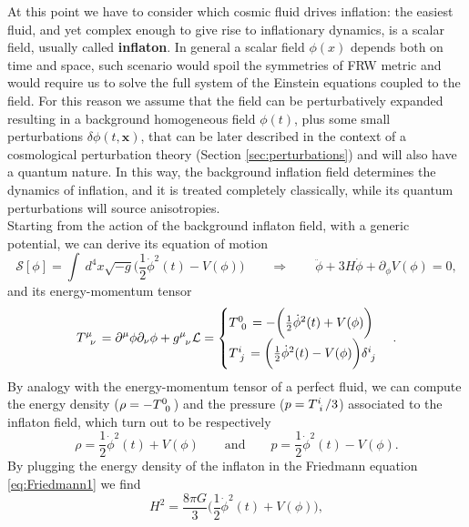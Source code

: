 At this point we have to consider which cosmic fluid drives inflation: the easiest fluid, and yet complex enough to give rise to inflationary dynamics, is a scalar field, usually called \textbf{inflaton}. In general a scalar field $\phi(x)$ depends both on time and space, such scenario would spoil the symmetries of FRW metric and would require us to solve the full system of the Einstein equations coupled to the field. For this reason we assume that the field can be perturbatively expanded resulting in a background homogeneous field $\phi(t)$, plus some small perturbations $\delta \phi(t,\mathbf x)$, that can be later described in the context of a cosmological perturbation theory (Section \ref{sec:perturbations}) and will also have a quantum nature. In this way, the background  inflation field determines the dynamics of inflation, and it is treated completely classically, while its quantum perturbations will source anisotropies.\\
Starting from the action of the background inflaton field, with a generic potential, we can derive its equation of motion
\begin{equation}
    \mathcal{S}[\phi]=\int\ d^4x\sqrt{-g}\bigg(\frac{1}{2}\dot\phi^2(t)-V(\phi)\bigg)\qquad\Rightarrow\qquad\boxed{\ddot\phi+3H\dot \phi+\partial_\phi V(\phi)=0},\label{eq:motion_inflaton}
\end{equation}
and its energy-momentum tensor
\begin{equation}
   \tensor{T}{^\mu_\nu}=\partial^\mu\phi\partial_\nu\phi+\tensor{g}{^\mu_\nu}\mathcal{L}=
   \begin{cases}
    \tensor{T}{^0_0}=-\bigg(\frac{1}{2}\dot\phi^2(t)+V(\phi)\bigg)\\
    \tensor{T}{^i_j}=\bigg(\frac{1}{2}\dot\phi^2(t)-V(\phi)\bigg)\tensor{\delta}{^i_j}\\
   \end{cases}.
\end{equation}
By analogy with the energy-momentum tensor of a perfect fluid, we can compute the energy density ($\rho=-\tensor{T}{^0_0}$) and the pressure ($p=\tensor{T}{^i_i}/3$) associated to the inflaton field, which turn out to be respectively
\begin{equation}
    \label{eq_rho_p_inflaton}
    \rho=\frac{1}{2}\dot\phi^2(t)+V(\phi)\qquad\text{and}\qquad p=\frac{1}{2}\dot\phi^2(t)-V(\phi).
\end{equation}
By plugging the energy density of the inflaton in the Friedmann equation \eqref{eq:Friedmann1} we find
\begin{equation}
    H^2=\frac{8\pi G}{3}\bigg(\frac{1}{2}\dot\phi^2(t)+V(\phi)\bigg),
    \label{eq:Friedmann_inflaton}
\end{equation}
